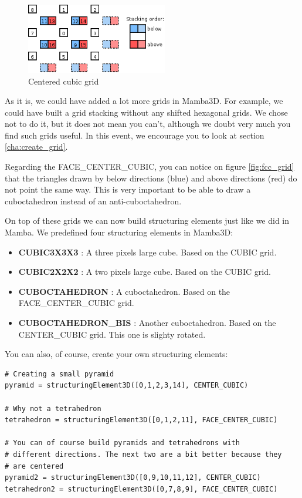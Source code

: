 \documentclass[a4paper,10pt,oneside]{article}
\begin{document}
\begin{itemize}
\begin{figure}
\centering
\includegraphics[width=0.55\textwidth]{ccubic_grid.png}
\caption{Centered cubic grid}
\label{fig:ccubic_grid}
\end{figure}

\end{itemize}

As it is, we could have added a lot more grids in Mamba3D. For example,
we could have built a grid stacking without any shifted hexagonal grids.
We chose not to do it, but it does not mean you can't, although we doubt very
much you find such grids useful. In this event, we encourage you to look
at section \ref{cha:create_grid}.

Regarding the FACE\_CENTER\_CUBIC, you can notice on figure \ref{fig:fcc_grid}
that the triangles drawn by below directions (blue) and above directions (red)
do not point the same way. This is very important to be able to draw a 
cuboctahedron instead of an anti-cuboctahedron.

On top of these grids we can now build structuring elements just like we did
in Mamba. We predefined four structuring elements in Mamba3D:

\begin{itemize}
\item \textbf{CUBIC3X3X3} : A three pixels large cube. Based on the CUBIC grid.
\item \textbf{CUBIC2X2X2} : A two pixels large cube. Based on the CUBIC grid.
\item \textbf{CUBOCTAHEDRON} : A cuboctahedron. Based on the
FACE\_CENTER\_CUBIC grid.
\item \textbf{CUBOCTAHEDRON\_BIS} : Another cuboctahedron. Based on the
CENTER\_CUBIC grid. This one is slighty rotated.
\end{itemize}

You can also, of course, create your own structuring elements:

\lstset{language=Python}
\begin{lstlisting}
# Creating a small pyramid
pyramid = structuringElement3D([0,1,2,3,14], CENTER_CUBIC)

# Why not a tetrahedron
tetrahedron = structuringElement3D([0,1,2,11], FACE_CENTER_CUBIC)

# You can of course build pyramids and tetrahedrons with
# different directions. The next two are a bit better because they
# are centered
pyramid2 = structuringElement3D([0,9,10,11,12], CENTER_CUBIC)
tetrahedron2 = structuringElement3D([0,7,8,9], FACE_CENTER_CUBIC)
\end{lstlisting}
\end{document}
